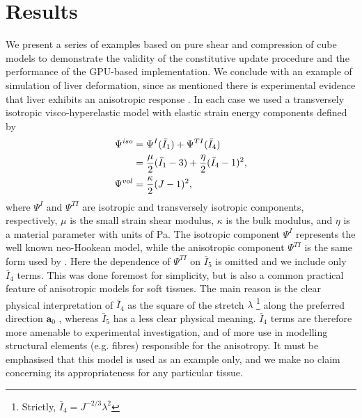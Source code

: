 
	
\section{Results}	

We present a series of examples based on pure shear and compression of cube models to demonstrate the validity of the constitutive update procedure and the performance of the GPU-based implementation. We conclude with an example of simulation of liver deformation, since as mentioned there is experimental evidence that liver exhibits an anisotropic response \citep{Chui07}. In each case we used a transversely isotropic visco-hyperelastic model with elastic strain energy components defined by
\begin{align}
\Psi^{iso} &= \Psi^{I}(\bar{I}_1) + \Psi^{TI}(\bar{I}_4) \notag \\
&= \dfrac{\mu}{2} (\bar{I}_1 - 3) + \dfrac{\eta}{2} (\bar{I}_4 - 1)^2, \\
\Psi^{vol} &= \dfrac{\kappa}{2} (J - 1)^2,
\end{align}
where $ \Psi^{I} $ and $ \Psi^{TI} $ are isotropic and transversely isotropic components, respectively, $ \mu $ is the small strain shear modulus, $ \kappa $ is the bulk modulus, and $ \eta $ is a material parameter with units of Pa. The isotropic component $ \Psi^{I} $ represents the well known neo-Hookean model, while the anisotropic component $ \Psi^{TI} $ is the same form used by \cite{Picinbono01}. Here the dependence of $ \Psi^{TI} $ on $ \bar{I}_5 $ is omitted and we include only $ \bar{I}_4 $ terms. This was done foremost for simplicity, but is also a common practical feature of anisotropic models for soft tissues. The main reason is the clear physical interpretation of $ \bar{I}_4 $ as the square of the stretch $ \lambda $ \footnote{Strictly, $ \bar{I}_4 = J^{-2/3} \lambda^2 $} along the preferred direction $ \mathbf{a}_0 $ \cite{Holzapfel00}, whereas $ \bar{I}_5 $ has a less clear physical meaning. $ \bar{I}_4 $ terms are therefore more amenable to experimental investigation, and of more use in modelling structural elements (e.g. fibres) responsible for the anisotropy. It must be emphasised that this model is used as an example only, and we make no claim concerning its appropriateness for any particular tissue.

\bigskip

